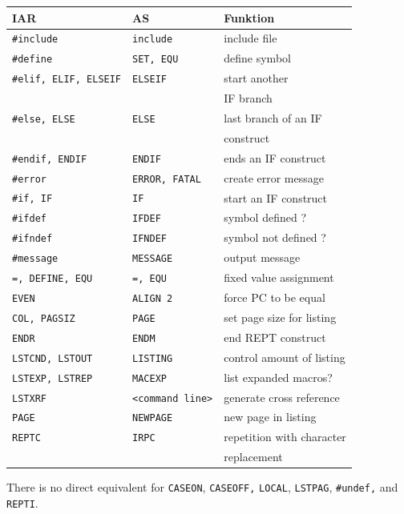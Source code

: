 \documentclass[12pt,twoside]{report}
\newcommand{\tty}[1]{{\tt #1}}
\newcommand{\asname}{{AS}}
\begin{document}
\begin{table}[htb]
\begin{center}\begin{tabular}{|l|l|l|}
\hline
IAR & \asname{} & Funktion\\
\hline
\hline
\tty{\#include} & \tty{include} & include file \\
\tty{\#define} & \tty{SET, EQU} & define symbol \\
\tty{\#elif, ELIF, ELSEIF} & \tty{ELSEIF} & start another \\
                           &              & IF branch \\
\tty{\#else, ELSE} & \tty{ELSE} & last branch of an IF \\
                   &            & construct \\
\tty{\#endif, ENDIF} & \tty{ENDIF} & ends an IF construct \\
\tty{\#error} & \tty{ERROR, FATAL} & create error message \\
\tty{\#if, IF} & \tty{IF} & start an IF construct \\
\tty{\#ifdef} & \tty{IFDEF} & symbol defined ? \\
\tty{\#ifndef} & \tty{IFNDEF} & symbol not defined ? \\
\tty{\#message} & \tty{MESSAGE} & output message \\
\tty{=, DEFINE, EQU} & \tty{=, EQU} & fixed value assignment \\
\tty{EVEN} & \tty{ALIGN 2} & force PC to be equal \\
\tty{COL, PAGSIZ} & \tty{PAGE} & set page size for listing \\
\tty{ENDR} & \tty{ENDM} & end REPT construct \\
\tty{LSTCND, LSTOUT} & \tty{LISTING} & control amount of listing \\
\tty{LSTEXP, LSTREP} & \tty{MACEXP} & list expanded macros? \\
\tty{LSTXRF} & \verb!<command line>! & generate cross reference \\
\tty{PAGE} & \tty{NEWPAGE} & new page in listing \\
\tty{REPTC} & \tty{IRPC} & repetition with character \\
            &            & replacement \\
\hline
\end{tabular}\end{center}
\end{table}

There is no direct equivalent for {\tt CASEON}, {\tt CASEOFF,}
\tty{LOCAL}, \tty{LSTPAG}, \tty{\#undef,} and {\tt REPTI}.
\end{document}
